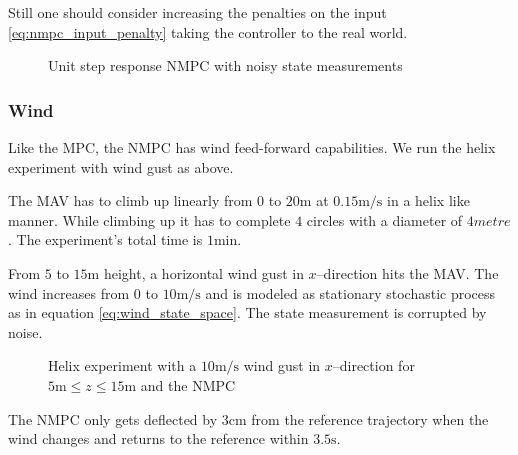 Still one should consider increasing the penalties on the input \ref{eq:nmpc_input_penalty} taking the controller to the real world.

\begin{figure}
\centering
{}
\qquad
{}
\caption{Unit step response NMPC with noisy state measurements}
\label{fig:nmpc_step_noisy}
\end{figure}


\subsubsection{Wind}
Like the MPC, the NMPC has wind feed-forward capabilities. We run the helix experiment with wind gust as above.

The MAV has to climb up linearly from $0$ to $20 \si{\metre}$ at $0.15 \si{\metre\per\second}$ in a helix like manner. While climbing up it has to complete $4$ circles with a diameter of $4\si{metre}$. The experiment's total time is $1 \si{\minute}$. 

From $5$ to $15 \si{\metre}$ height, a horizontal wind gust in $x$--direction hits the MAV. The wind increases from $0$ to $10 \si{\metre\per\second}$ and is modeled as stationary stochastic process as in equation \ref{eq:wind_state_space}. The state measurement is corrupted by noise.

\begin{figure}
\centering
{}
\qquad
{}
\caption{Helix experiment with a $10 \si{\metre\per\second}$ wind gust in $x$--direction for $5 \si{\metre} \leq z \leq 15 \si{\metre}$ and the NMPC}
\label{fig:nmpc_helix}
\end{figure}

The NMPC only gets deflected by $3\si{\centi\metre}$ from the reference trajectory when the wind changes and returns to the reference within $3.5 \si{\second}$. 